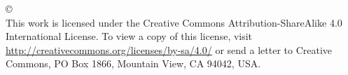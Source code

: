 
\thispagestyle{empty} %
\null\vfill %
\begin{center}
  \SingleSpace %
© \@date~\@author\\
This work is licensed under the Creative Commons Attribution-ShareAlike 4.0 International License. To view a copy of this license, visit \url{http://creativecommons.org/licenses/by-sa/4.0/} or send a letter to Creative Commons, PO Box 1866, Mountain View, CA 94042, USA.
\end{center}
